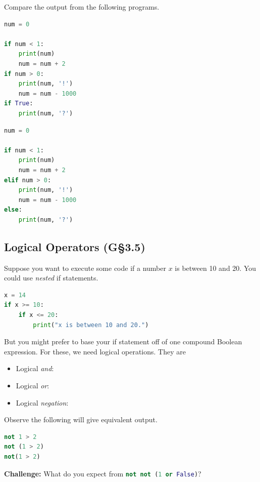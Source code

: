 Compare the output from the following programs.

\begin{lstlisting}[language = Python]
num = 0

if num < 1:
    print(num)
    num = num + 2
if num > 0:
    print(num, '!')
    num = num - 1000
if True:
    print(num, '?') \end{lstlisting}


\begin{lstlisting}[language = Python]
num = 0

if num < 1:
    print(num)
    num = num + 2
elif num > 0:
    print(num, '!')
    num = num - 1000
else:
    print(num, '?') \end{lstlisting}


\subsection{Logical Operators (G\S 3.5)}

Suppose you want to execute some code if a number $x$ is between 10 and 20. You could use \emph{nested} if statements.
\begin{lstlisting}[language = Python]
x = 14
if x >= 10:
    if x <= 20:
        print("x is between 10 and 20.") \end{lstlisting}
        

\smallskip
 But you might prefer to base your if statement off of one compound Boolean expression. For these, we need logical operations. They are

\begin{itemize}

\item Logical \textit{and}:  %
\item Logical \textit{or}:  %
\item Logical \textit{negation}: 
\end{itemize}
\smallskip

Observe the following will give equivalent output.

\begin{lstlisting}[language = Python]
not 1 > 2
not (1 > 2)
not(1 > 2) \end{lstlisting}


\smallskip

 \textbf{Challenge: } What do you expect from \lstinline[language = Python]{not not (1 or False)}?
        


